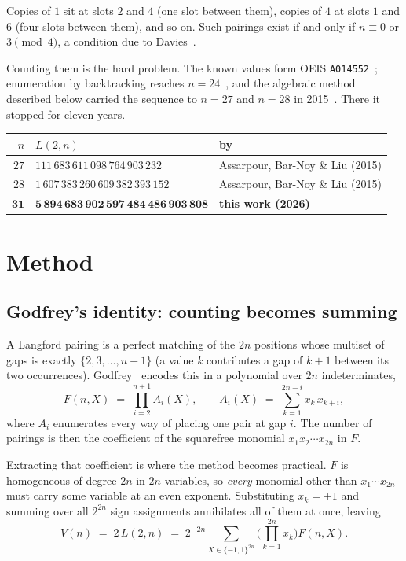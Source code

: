\documentclass[11pt,a4paper]{article}
\begin{document}
\noindent
Copies of $1$ sit at slots $2$ and $4$ (one slot between them), copies of $4$ at
slots $1$ and $6$ (four slots between them), and so on. Such pairings exist if
and only if $n \equiv 0$ or $3 \pmod 4$, a condition due to Davies~\cite{davies}.

Counting them is the hard problem. The known values form OEIS
\texttt{A014552}~\cite{oeis}; enumeration by backtracking reaches
$n=24$~\cite{confiit}, and the algebraic method described below carried the
sequence to $n=27$ and $n=28$ in 2015~\cite{abl}. There it stopped for eleven
years.

\begin{center}
\begin{tabular}{@{}rll@{}}
\toprule
$n$ & $L(2,n)$ & by \\
\midrule
$27$ & $111\,683\,611\,098\,764\,903\,232$ & Assarpour, Bar-Noy \& Liu (2015) \\
$28$ & $1\,607\,383\,260\,609\,382\,393\,152$ & Assarpour, Bar-Noy \& Liu (2015) \\
$\mathbf{31}$ & $\mathbf{5\,894\,683\,902\,597\,484\,486\,903\,808}$ & \textbf{this work (2026)} \\
\bottomrule
\end{tabular}
\end{center}

\section{Method}

\subsection{Godfrey's identity: counting becomes summing}

A Langford pairing is a perfect matching of the $2n$ positions whose multiset of
gaps is exactly $\{2,3,\dots,n+1\}$ (a value $k$ contributes a gap of $k+1$
between its two occurrences). Godfrey~\cite{godfrey} encodes this in a
polynomial over $2n$ indeterminates,
\begin{equation}
  F(n,X) \;=\; \prod_{i=2}^{n+1} A_i(X),
  \qquad
  A_i(X) \;=\; \sum_{k=1}^{2n-i} x_k\,x_{k+i},
  \label{eq:F}
\end{equation}
where $A_i$ enumerates every way of placing one pair at gap $i$. The number of
pairings is then the coefficient of the squarefree monomial
$x_1 x_2 \cdots x_{2n}$ in $F$.

Extracting that coefficient is where the method becomes practical. $F$ is
homogeneous of degree $2n$ in $2n$ variables, so \emph{every} monomial other
than $x_1\cdots x_{2n}$ must carry some variable at an even exponent.
Substituting $x_k = \pm 1$ and summing over all $2^{2n}$ sign assignments
annihilates all of them at once, leaving
\begin{equation}
  V(n) \;=\; 2\,L(2,n) \;=\; 2^{-2n}
  \sum_{X \in \{-1,1\}^{2n}} \Big( \prod_{k=1}^{2n} x_k \Big) F(n,X).
  \label{eq:godfrey}
\end{equation}
\end{document}
